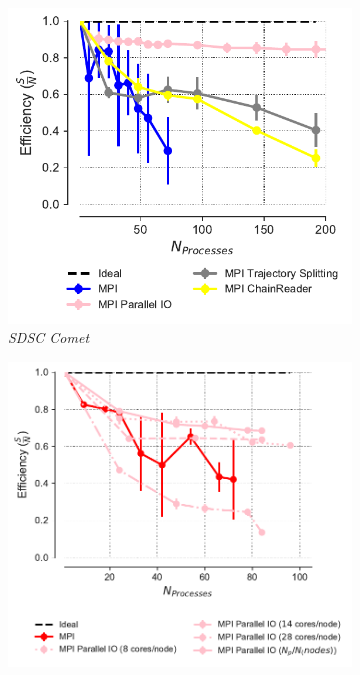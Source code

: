 \begin{figure}[!htb]
  \centering
  \begin{subfigure}{.3\textwidth}
    \includegraphics[width=\linewidth]{figures/Comparison_Efficiency_all_Comet.pdf}
    \caption{\emph{SDSC Comet}}
    \label{fig:comparison_efficiency}
  \end{subfigure}
  \hfill
  \begin{subfigure}{.35\textwidth}
    \includegraphics[width=\linewidth]{figures/Comparison_Efficiency_all_Bridges.pdf}

\end{subfigure}
\end{figure}
